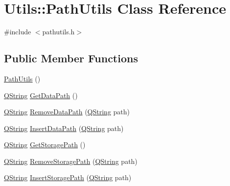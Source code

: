\hypertarget{class_utils_1_1_path_utils}{\section{\-Utils\-:\-:\-Path\-Utils \-Class \-Reference}
\label{class_utils_1_1_path_utils}
}


{\ttfamily \#include $<$pathutils.\-h$>$}

\subsection*{\-Public \-Member \-Functions}
\begin{DoxyCompactItemize}
\item 
\hyperlink{class_utils_1_1_path_utils_a0d137a581101db5751430035e4902d87}{\-Path\-Utils} ()
\item 
\hyperlink{group___u_a_v_objects_plugin_gab9d252f49c333c94a72f97ce3105a32d}{\-Q\-String} \hyperlink{class_utils_1_1_path_utils_a48d01eb74f2c41cf8933fdfcc2b75974}{\-Get\-Data\-Path} ()
\item 
\hyperlink{group___u_a_v_objects_plugin_gab9d252f49c333c94a72f97ce3105a32d}{\-Q\-String} \hyperlink{class_utils_1_1_path_utils_ae13b2f08493b1d7ba3d640796a34a5c6}{\-Remove\-Data\-Path} (\hyperlink{group___u_a_v_objects_plugin_gab9d252f49c333c94a72f97ce3105a32d}{\-Q\-String} path)
\item 
\hyperlink{group___u_a_v_objects_plugin_gab9d252f49c333c94a72f97ce3105a32d}{\-Q\-String} \hyperlink{class_utils_1_1_path_utils_ac0b4cac7c56d6239e1dfe637e3982dfb}{\-Insert\-Data\-Path} (\hyperlink{group___u_a_v_objects_plugin_gab9d252f49c333c94a72f97ce3105a32d}{\-Q\-String} path)
\item 
\hyperlink{group___u_a_v_objects_plugin_gab9d252f49c333c94a72f97ce3105a32d}{\-Q\-String} \hyperlink{class_utils_1_1_path_utils_ac8a4ac1453876aedf665dac78b3b0f0b}{\-Get\-Storage\-Path} ()
\item 
\hyperlink{group___u_a_v_objects_plugin_gab9d252f49c333c94a72f97ce3105a32d}{\-Q\-String} \hyperlink{class_utils_1_1_path_utils_a6e03d8cb95a79c0f70f530d43d5733d4}{\-Remove\-Storage\-Path} (\hyperlink{group___u_a_v_objects_plugin_gab9d252f49c333c94a72f97ce3105a32d}{\-Q\-String} path)
\item 
\hyperlink{group___u_a_v_objects_plugin_gab9d252f49c333c94a72f97ce3105a32d}{\-Q\-String} \hyperlink{class_utils_1_1_path_utils_a58a574f94e7fde2e7746820edba96ce2}{\-Insert\-Storage\-Path} (\hyperlink{group___u_a_v_objects_plugin_gab9d252f49c333c94a72f97ce3105a32d}{\-Q\-String} path)
\end{DoxyCompactItemize}


